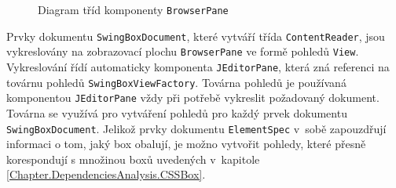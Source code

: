 \begin{figure}[H]
  \begin{center}
    \caption{Diagram tříd komponenty \texttt{BrowserPane}}
    \label{Figure.SwingBoxDesign}
  \end{center}
\end{figure}

Prvky dokumentu \texttt{SwingBoxDocument}, které vytváří třída \texttt{ContentReader}, jsou vykreslovány na zobrazovací plochu \texttt{BrowserPane} ve formě pohledů \texttt{View}. Vykreslování řídí automaticky komponenta \texttt{JEditorPane}, která zná referenci na továrnu pohledů \linebreak\texttt{SwingBoxViewFactory}. Továrna pohledů je používaná komponentou \texttt{JEditorPane} vždy při potřebě vykreslit požadovaný dokument. Továrna se využívá pro vytváření pohledů pro každý prvek dokumentu \texttt{SwingBoxDocument}. Jelikož prvky dokumentu \texttt{ElementSpec} v~sobě zapouzdřují informaci o tom, jaký box obalují, je možno vytvořit pohledy, které přesně korespondují s množinou boxů uvedených v~kapitole \ref{Chapter.DependenciesAnalysis.CSSBox}.

